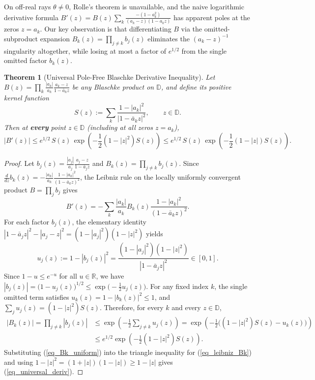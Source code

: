 \documentclass[11pt,reqno]{amsart}
\newtheorem{thm}{Theorem}[section]
\numberwithin{equation}{section}
\newcommand{\R}{\mathbb{R}}
\newcommand{\D}{\mathbb{D}}
\begin{document}
On off-real rays $\theta \ne 0$, Rolle's theorem is unavailable, and the naive logarithmic derivative formula $B'(z) = B(z) \sum_{k} \frac{-(1 - a_k^2)}{(a_k - z)(1 - a_k z)}$ has apparent poles at the zeros $z = a_k$. Our key observation is that differentiating $B$ via the omitted-subproduct expansion $B_k(z) = \prod_{j \ne k} b_j(z)$ eliminates the $(a_k - z)^{-1}$ singularity altogether, while losing at most a factor of $e^{1/2}$ from the single omitted factor $b_k(z)$.

\begin{thm}[Universal Pole-Free Blaschke Derivative Inequality] \label{thm_pole_free}
Let $B(z) = \prod_{k} \frac{|a_k|}{a_k} \frac{a_k - z}{1 - \bar{a}_k z}$ be any Blaschke product on $\D$, and define its positive kernel function
\begin{equation} \label{eq_Sz_def}
  S(z) := \sum_k \frac{1 - |a_k|^2}{|1 - \bar{a}_k z|^2}, \qquad z \in \D.
\end{equation}
Then at \textbf{every} point $z \in \D$ (including at all zeros $z = a_k$),
\begin{equation} \label{eq_universal_deriv}
  |B'(z)| \le e^{1/2} \, S(z) \, \exp\!\left(-\frac{1}{2}(1 - |z|^2) S(z)\right)
  \le e^{1/2} \, S(z) \, \exp\!\left(-\frac{1}{2}(1 - |z|) S(z)\right).
\end{equation}
\end{thm}
\begin{proof}
Let $b_j(z) = \frac{|a_j|}{a_j} \frac{a_j - z}{1 - \bar{a}_j z}$ and $B_k(z) = \prod_{j \ne k} b_j(z)$. Since $\frac{d}{dz} b_k(z) = -\frac{|a_k|}{a_k} \frac{1 - |a_k|^2}{(1 - \bar{a}_k z)^2}$, the Leibniz rule on the locally uniformly convergent product $B = \prod_j b_j$ gives
\begin{equation} \label{eq_leibniz_Bk}
  B'(z) = -\sum_k \frac{|a_k|}{a_k} B_k(z) \frac{1 - |a_k|^2}{(1 - \bar{a}_k z)^2}.
\end{equation}
For each factor $b_j(z)$, the elementary identity $|1 - \bar{a}_j z|^2 - |a_j - z|^2 = (1 - |a_j|^2)(1 - |z|^2)$ yields
\begin{equation} \label{eq_u_j}
  u_j(z) := 1 - |b_j(z)|^2 = \frac{(1 - |a_j|^2)(1 - |z|^2)}{|1 - \bar{a}_j z|^2} \in [0, 1].
\end{equation}
Since $1 - u \le e^{-u}$ for all $u \in \R$, we have $|b_j(z)| = \bigl(1 - u_j(z)\bigr)^{1/2} \le \exp\bigl(-\frac{1}{2} u_j(z)\bigr)$. For any fixed index $k$, the single omitted term satisfies $u_k(z) = 1 - |b_k(z)|^2 \le 1$, and $\sum_j u_j(z) = (1 - |z|^2) S(z)$. Therefore, for every $k$ and every $z \in \D$,
\begin{align} \label{eq_Bk_uniform}
  |B_k(z)| = \prod_{j \ne k} |b_j(z)|
  &\le \exp\!\left(-\frac{1}{2} \sum_{j \ne k} u_j(z)\right)
  = \exp\!\left(-\frac{1}{2}\bigl((1 - |z|^2) S(z) - u_k(z)\bigr)\right) \nonumber \\
  &\le e^{1/2} \exp\!\left(-\frac{1}{2}(1 - |z|^2) S(z)\right).
\end{align}
Substituting (\ref{eq_Bk_uniform}) into the triangle inequality for (\ref{eq_leibniz_Bk}) and using $1 - |z|^2 = (1 + |z|)(1 - |z|) \ge 1 - |z|$ gives (\ref{eq_universal_deriv}).
\end{proof}
\end{document}
